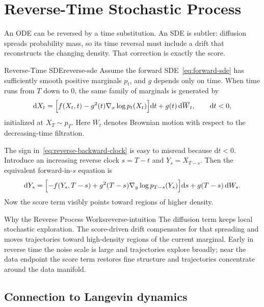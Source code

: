 \documentclass[11pt,a4paper]{article}
\renewcommand{\d}{\mathrm{d}}
\newcommand{\bW}{\overline{W}}
\begin{document}
\section{Reverse-Time Stochastic Process}\label{sec:reverse}

An ODE can be reversed by a time substitution.  An SDE is subtler: diffusion
spreads probability mass, so its time reversal must include a drift that
reconstructs the changing density.  That correction is exactly the score.

\begin{theorem}{Reverse-Time SDE}{reverse-sde}
Assume the forward SDE~\eqref{eq:forward-sde} has sufficiently smooth positive
marginals $p_t$, and $g$ depends only on time.  When time runs from $T$ down to
$0$, the same family of marginals is generated by
\begin{equation}\label{eq:reverse-backward-clock}
  \d X_t
  =\Bigl[f(X_t,t)-g^2(t)\nabla_x\log p_t(X_t)\Bigr]\d t
   +g(t)\,\d\bW_t,
  \qquad \d t<0,
\end{equation}
initialized at $X_T\sim p_T$.  Here $\bW_t$ denotes Brownian motion with
respect to the decreasing-time filtration.
\end{theorem}

The sign in~\eqref{eq:reverse-backward-clock} is easy to misread because
$\d t<0$.  Introduce an increasing reverse clock $s=T-t$ and
$Y_s=X_{T-s}$.  Then the equivalent forward-in-$s$ equation is
\begin{equation}\label{eq:reverse-forward-clock}
  \d Y_s
  =\Bigl[-f(Y_s,T-s)
          +g^2(T-s)\nabla_y\log p_{T-s}(Y_s)\Bigr]\d s
   +g(T-s)\,\d W_s.
\end{equation}
Now the score term visibly points toward regions of higher density.

\begin{remark}{Why the Reverse Process Works}{reverse-intuition}
The diffusion term keeps local stochastic exploration.  The score-driven
drift compensates for that spreading and moves trajectories toward high-density
regions of the current marginal.  Early in reverse time the noise scale is
large and trajectories explore broadly; near the data endpoint the score term
restores fine structure and trajectories concentrate around the data manifold.
\end{remark}

\subsection{Connection to Langevin dynamics}
\end{document}
